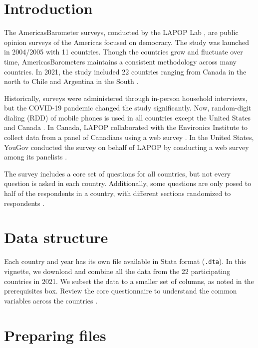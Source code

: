 \documentclass[
]{krantz}
\begin{document}
\hypertarget{introduction-11}{%
\section{Introduction}\label{introduction-11}}

The AmericasBarometer surveys, conducted by the LAPOP Lab \citep{lapop}, are public opinion surveys of the Americas focused on democracy. The study was launched in 2004/2005 with 11 countries. Though the countries grow and fluctuate over time, AmericasBarometers maintains a consistent methodology across many countries. In 2021, the study included 22 countries ranging from Canada in the north to Chile and Argentina in the South \citep{lapop-about}.

Historically, surveys were administered through in-person household interviews, but the COVID-19 pandemic changed the study significantly. Now, random-digit dialing (RDD) of mobile phones is used in all countries except the United States and Canada \citep{lapop-tech}. In Canada, LAPOP collaborated with the Environics Institute to collect data from a panel of Canadians using a web survey \citep{lapop-can}. In the United States, YouGov conducted the survey on behalf of LAPOP by conducting a web survey among its panelists \citep{lapop-usa}.

The survey includes a core set of questions for all countries, but not every question is asked in each country. Additionally, some questions are only posed to half of the respondents in a country, with different sections randomized to respondents \citep{lapop-svy}.

\hypertarget{data-structure-1}{%
\section{Data structure}\label{data-structure-1}}

Each country and year has its own file available in Stata format (\texttt{.dta}). In this vignette, we download and combine all the data from the 22 participating countries in 2021. We subset the data to a smaller set of columns, as noted in the prerequisites box. Review the core questionnaire to understand the common variables across the countries \citep{lapop-svy}.

\hypertarget{preparing-files}{%
\section{Preparing files}\label{preparing-files}}
\end{document}
